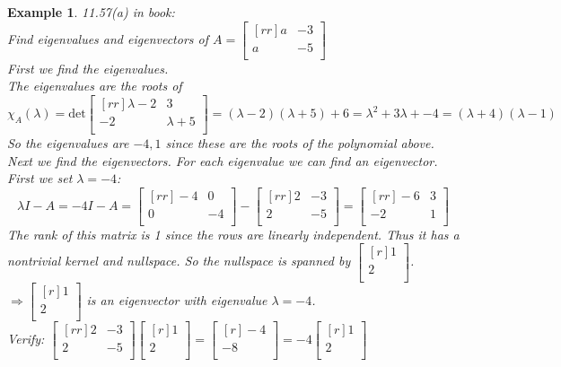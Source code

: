 \documentclass{report}
\newtheorem*{ex}{Example}
\begin{document}
\begin{ex}
11.57(a) in book:\\
Find eigenvalues and eigenvectors of $A=\begin{bmatrix}[rr]a&-3\\a&-5\\\end{bmatrix}$\\
First we find the eigenvalues.\\
The eigenvalues are the roots of
\[ \chi_A(\lambda)=\mathrm{det}\begin{bmatrix}[rr]\lambda - 2&3\\-2&\lambda + 5\\\end{bmatrix} = (\lambda - 2)(\lambda + 5) + 6 = \lambda^2+3\lambda + -4 = (\lambda + 4)(\lambda - 1) \]
So the eigenvalues are $-4,1$ since these are the roots of the polynomial above.\\
Next we find the eigenvectors. For each eigenvalue we can find an eigenvector.\\
First we set $\lambda = -4$:
\[ \lambda I-A = -4I-A = \begin{bmatrix}[rr]-4&0\\0&-4\\\end{bmatrix} - \begin{bmatrix}[rr]2&-3\\2&-5\\\end{bmatrix}=\begin{bmatrix}[rr]-6&3\\-2&1\\\end{bmatrix} \]
The rank of this matrix is 1 since the rows are linearly independent. Thus it has a nontrivial kernel and nullspace. So the nullspace is spanned by $\begin{bmatrix}[r]1\\2\\\end{bmatrix}$.\\
$\Rightarrow \begin{bmatrix}[r]1\\2\\\end{bmatrix}$ is an eigenvector with eigenvalue $\lambda=-4$.\\
Verify: $\begin{bmatrix}[rr]2&-3\\2&-5\\\end{bmatrix}\begin{bmatrix}[r]1\\2\\\end{bmatrix} = \begin{bmatrix}[r]-4\\-8\\\end{bmatrix} = -4\begin{bmatrix}[r]1\\2\\\end{bmatrix}$\\

\end{ex}
\end{document}
